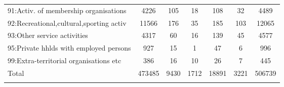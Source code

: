 {\begin{longtable}{l*{6}{c}}
91:Activ. of membership organisations&     4226&      105&       18&      108&       32&     4489\\
92:Recreational,cultural,sporting activ&    11566&      176&       35&      185&      103&    12065\\
93:Other service activities&     4317&       60&       16&      139&       45&     4577\\
95:Private hhlds with employed persons&      927&       15&        1&       47&        6&      996\\
99:Extra-territorial organisations etc&      386&       16&       10&       26&        7&      445\\
Total     &   473485&     9430&     1712&    18891&     3221&   506739\\
\hline\hline
\label{tab:2D_industries}
\end{longtable}
}
